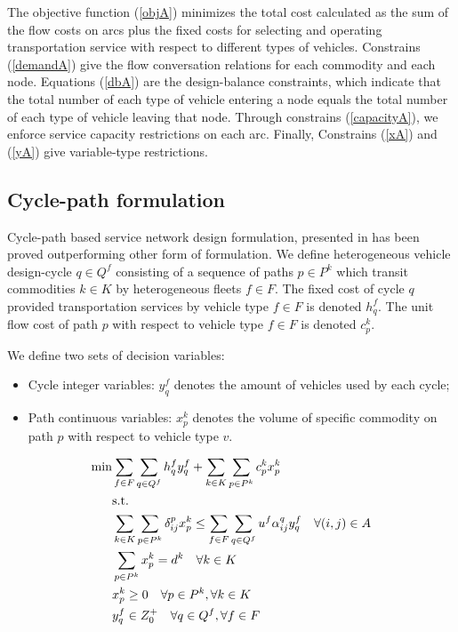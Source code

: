 \documentclass[11pt,nonblindrev,fleqn]{article}
\begin{document}
The objective function (\ref{objA}) minimizes the total cost calculated as the sum of the flow costs on arcs plus the fixed costs for selecting and operating transportation service with respect to different types of vehicles. Constrains (\ref{demandA}) give the flow conversation relations for each commodity and each node. Equations (\ref{dbA}) are the design-balance constraints, which indicate that the total number of each type of vehicle entering a node equals the total number of each type of vehicle leaving that node. Through constrains (\ref{capacityA}), we enforce service capacity restrictions on each arc. Finally, Constrains (\ref{xA}) and (\ref{yA}) give variable-type restrictions.

\subsection{Cycle-path formulation}
Cycle-path based service network design formulation, presented in \cite{Andersen2011Branch} has been proved outperforming other form of formulation. We define heterogeneous vehicle design-cycle $q\in Q^f$ consisting of a sequence of paths $p\in P^k$ which transit commodities $k\in K$ by heterogeneous fleets $f\in F$. The fixed cost of cycle $q$ provided transportation services by vehicle type $f\in F$ is denoted $h_q^f$. The unit flow cost of path $p$ with respect to vehicle type $f\in F$ is denoted $c_p^k$.

We define two sets of decision variables:
\begin{itemize}
  \item Cycle integer variables: $y_q^f$ denotes the amount of vehicles used by each cycle;
  \item Path continuous variables: $x_p^k$ denotes the volume of specific commodity on path $p$ with respect to vehicle type $v$.
\end{itemize}

\begin{align}
  \min &    \sum_{f\in F}\sum_{q\in Q^f}h_q^f y_q^f  +   \sum_{k\in K}\sum_{p\in P^k}c_p^k x_p^k  \label{objCP}    \\
         & \rm{s.t.} \nonumber \\
         &     \sum_{k\in K}\sum_{p\in P^k}\delta_{ij}^p x_p^k \leq  \sum_{f\in F}\sum_{q\in Q^f}u^f \alpha_{ij}^q y_q^f      \quad \forall (i,j)\in A \label{capacityCP}\\
         &     \sum_{p\in P^k}x_p^k = d^k      \quad       \forall k\in K  \label{demandCP}    \\
         &      x_p^k \geq 0        \quad       \forall p\in P^k,\forall k\in K     \label{xCP} \\
         &      y_q^f \in Z_0^+     \quad       \forall q\in Q^f, \forall f\in F    \label{yCP}
\end{align}
\end{document}
